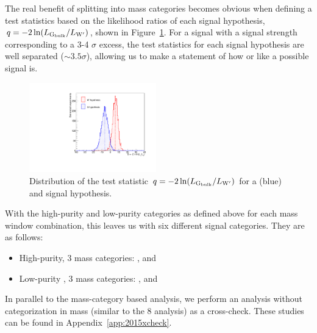 The real benefit of splitting into mass categories becomes obvious when defining a test statistics based on the likelihood ratios of each signal hypothesis, $q = -2 \ln(L_{\mathrm{G}_\mathrm{bulk}}/L_{\mathrm{W}^\prime})$, shown in Figure~\ref{fig:searchI:signalsep}. For a signal with a signal strength corresponding to a 3-4 $\sigma$ excess, the test statistics for each signal hypothesis are well separated ($\sim3.5 \sigma$), allowing us to make a statement of how \BulkG or \PWpr like a possible signal is.
\begin{figure}[h!p]
 \centering
 \includegraphics[width=0.49\textwidth]{figures/analysis/search1/AN-15-196/massCategories/sig_sep.pdf}
 \caption{Distribution of the test statistic  $q = -2 \ln(L_{\mathrm{G}_\mathrm{bulk}}/L_{\mathrm{W}^\prime})$ for a \BulkG (blue) and \PWpr signal hypothesis.}
 \label{fig:searchI:signalsep}
 \end{figure}
With the high-purity and low-purity categories as defined above for each mass window combination, this leaves us with six different signal categories. They are as follows:
\begin{itemize}
\item High-purity, 3 mass categories: \WW, \ZZ and \WZ
\item Low-purity , 3 mass categories: \WW, \ZZ and \WZ
\end{itemize}
In parallel to the mass-category based analysis, we perform an analysis without categorization in mass (similar to the 8 \TeV analysis) as a cross-check. These studies can be found in Appendix~\ref{app:2015xcheck}.
